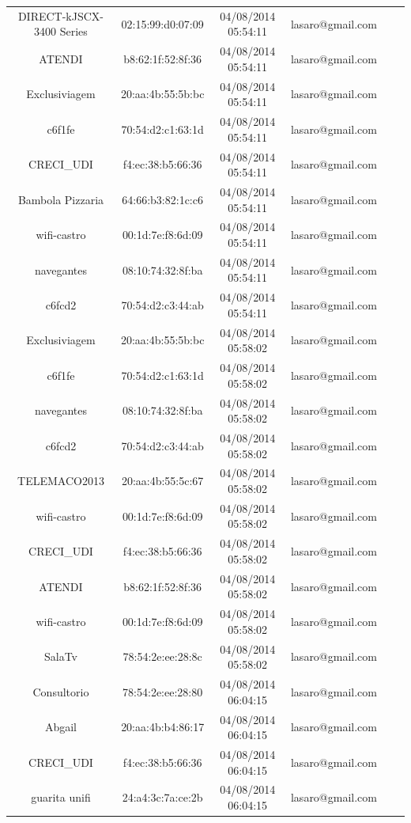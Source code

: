 \documentclass[12pt, %
openright, 
oneside,
a4paper,
brazil]{facom-ufu-abntex2}
\begin{document}
\begin{table}
\begin{longtable}{|c|c|c|c|c|c|}
DIRECT-kJSCX-3400 Series & 02:15:99:d0:07:09 & 04/08/2014 05:54:11 & lasaro@gmail.com \\
ATENDI & b8:62:1f:52:8f:36 & 04/08/2014 05:54:11 & lasaro@gmail.com \\
Exclusiviagem & 20:aa:4b:55:5b:bc & 04/08/2014 05:54:11 & lasaro@gmail.com \\
c6f1fe & 70:54:d2:c1:63:1d & 04/08/2014 05:54:11 & lasaro@gmail.com \\
CRECI\_UDI & f4:ec:38:b5:66:36 & 04/08/2014 05:54:11 & lasaro@gmail.com \\
Bambola Pizzaria & 64:66:b3:82:1c:c6 & 04/08/2014 05:54:11 & lasaro@gmail.com \\
wifi-castro & 00:1d:7e:f8:6d:09 & 04/08/2014 05:54:11 & lasaro@gmail.com \\
navegantes & 08:10:74:32:8f:ba & 04/08/2014 05:54:11 & lasaro@gmail.com \\
c6fcd2 & 70:54:d2:c3:44:ab & 04/08/2014 05:54:11 & lasaro@gmail.com \\
Exclusiviagem & 20:aa:4b:55:5b:bc & 04/08/2014 05:58:02 & lasaro@gmail.com \\
c6f1fe & 70:54:d2:c1:63:1d & 04/08/2014 05:58:02 & lasaro@gmail.com \\
navegantes & 08:10:74:32:8f:ba & 04/08/2014 05:58:02 & lasaro@gmail.com \\
c6fcd2 & 70:54:d2:c3:44:ab & 04/08/2014 05:58:02 & lasaro@gmail.com \\
TELEMACO2013 & 20:aa:4b:55:5c:67 & 04/08/2014 05:58:02 & lasaro@gmail.com \\
wifi-castro & 00:1d:7e:f8:6d:09 & 04/08/2014 05:58:02 & lasaro@gmail.com \\
CRECI\_UDI & f4:ec:38:b5:66:36 & 04/08/2014 05:58:02 & lasaro@gmail.com \\
ATENDI & b8:62:1f:52:8f:36 & 04/08/2014 05:58:02 & lasaro@gmail.com \\
wifi-castro & 00:1d:7e:f8:6d:09 & 04/08/2014 05:58:02 & lasaro@gmail.com \\
SalaTv & 78:54:2e:ee:28:8c & 04/08/2014 05:58:02 & lasaro@gmail.com \\
Consultorio & 78:54:2e:ee:28:80 & 04/08/2014 06:04:15 & lasaro@gmail.com \\
Abgail & 20:aa:4b:b4:86:17 & 04/08/2014 06:04:15 & lasaro@gmail.com \\
CRECI\_UDI & f4:ec:38:b5:66:36 & 04/08/2014 06:04:15 & lasaro@gmail.com \\
guarita unifi & 24:a4:3c:7a:ce:2b & 04/08/2014 06:04:15 & lasaro@gmail.com \\

\end{longtable}
\end{table}
\end{document}
